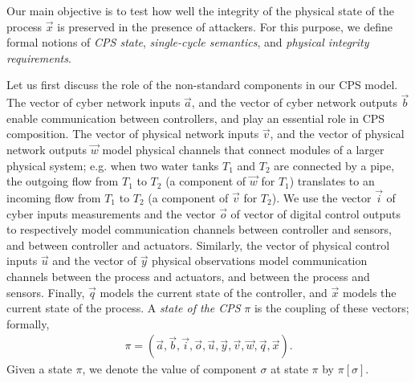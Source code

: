 Our main objective is to test how well the integrity of the physical state of the process $\vec{x}$ is preserved in the presence of attackers. For this purpose, we define formal notions of \emph{CPS state}, \emph{single-cycle semantics}, and \emph{physical integrity requirements}.
\begin{definition}
\label{def:States}
Let us first discuss the role of the non-standard components in our CPS model. The vector of cyber network inputs $\vec{a}$, and the vector of cyber network outputs $\vec{b}$ enable communication between controllers, and play an essential role in CPS composition. The vector of physical network inputs $\vec{v}$, and the vector of physical network outputs $\vec{w}$ model physical channels that connect modules of a larger physical system; e.g. when two water tanks $T_1$ and $T_2$ are connected by a pipe, the outgoing flow from $T_1$ to $T_2$ (a component of $\vec{w}$ for $T_1$) translates to an incoming flow from $T_1$ to $T_2$ (a component of $\vec{v}$ for $T_2$). We use the vector $\vec{i}$ of cyber inputs measurements and the vector $\vec{o}$ of vector of digital control outputs to respectively model communication channels between controller and sensors, and between controller and actuators. Similarly, the vector of physical control inputs $\vec{u}$ and the vector of $\vec{y}$ physical observations model communication channels between the process and actuators, and between the process and sensors. Finally, $\vec{q}$ models the current state of the controller, and $\vec{x}$ models the current state of the process. A \emph{state of the CPS} $\pi$ is the coupling of these vectors; formally, 
\begin{align}
\pi=(\vec{a},\vec{b},\vec{i},\vec{o},\vec{u},\vec{y},\vec{v},\vec{w},\vec{q},\vec{x}).
\end{align}
Given a state $\pi$, we denote the value of component $\sigma$ at state $\pi$ by $\pi[\sigma]$. 


\end{definition}
